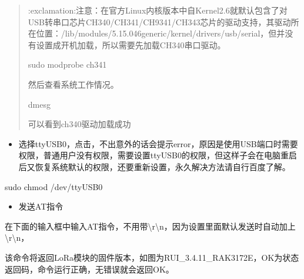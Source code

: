 \documentclass[a4paper,12pt,english]{sphinxmanual}
\begin{document}
{{\begin{quote}
\sphinxAtStartPar
:exclamation:注意：在官方Linux内核版本中自Kernel2.6就默认包含了对USB转串口芯片CH340/CH341/CH9341/CH343芯片的驱动支持，其驱动所在位置：/lib/modules/5.15.0\sphinxhyphen{}46\sphinxhyphen{}generic/kernel/drivers/usb/serial，但并没有设置成开机加载，所以需要先加载CH340串口驱动。

\begin{sphinxVerbatim}[commandchars=\\\{\}]
sudo modprobe ch341
\end{sphinxVerbatim}

\sphinxAtStartPar
然后查看系统工作情况。

\begin{sphinxVerbatim}[commandchars=\\\{\}]
dmesg
\end{sphinxVerbatim}

\sphinxAtStartPar
{}

\sphinxAtStartPar
可以看到ch340驱动加载成功
\end{quote}
\begin{itemize}
\item {} 
\sphinxAtStartPar
选择ttyUSB0，点击，不出意外的话会提示error，原因是使用USB端口时需要权限，普通用户没有权限，需要设置ttyUSB0的权限，但这样子会在电脑重启后又恢复系统默认的权限，还要重新设置，永久解决方法请自行百度了解。

\end{itemize}

\begin{sphinxVerbatim}[commandchars=\\\{\}]
sudo chmod  /dev/ttyUSB0
\end{sphinxVerbatim}

\sphinxAtStartPar
{}
\begin{itemize}
\item {} 
\sphinxAtStartPar
发送AT指令

\end{itemize}

\sphinxAtStartPar
在下面的输入框中输入AT指令，不用带\textbackslash{}r\textbackslash{}n，因为设置里面默认发送时自动加上\textbackslash{}r\textbackslash{}n，

\sphinxAtStartPar
{}

\sphinxAtStartPar
该命令将返回LoRa模块的固件版本，如图为RUI\_3.4.11\_RAK3172\sphinxhyphen{}E，OK为状态返回码，命令运行正确，无错误就会返回OK。

}}
\end{document}

